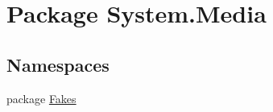 \hypertarget{namespace_system_1_1_media}{\section{Package System.\-Media}
\label{namespace_system_1_1_media}
}
\subsection*{Namespaces}
\begin{DoxyCompactItemize}
\item 
package \hyperlink{namespace_system_1_1_media_1_1_fakes}{Fakes}
\end{DoxyCompactItemize}

